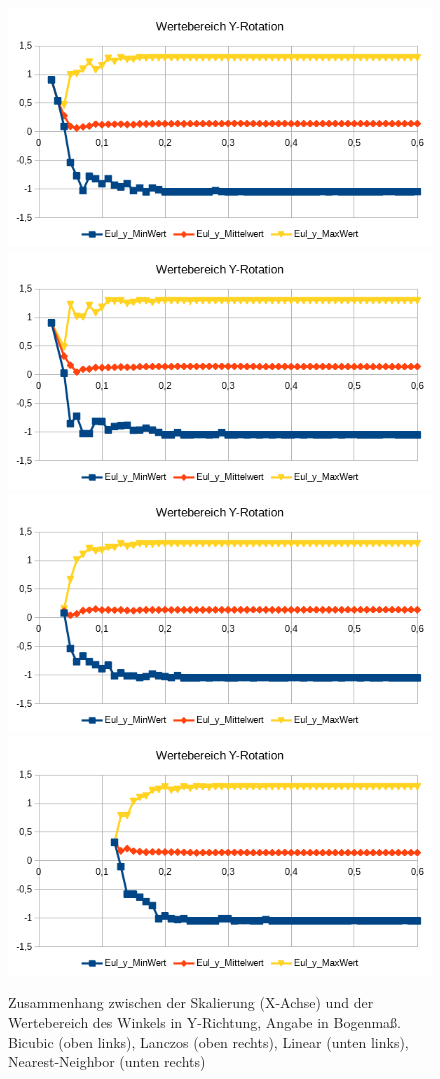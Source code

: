 \begin{figure}
	\centering
	\includegraphics[width=0.45\linewidth]{tabelle2/Y_Rot_Val_Cubic}
	\includegraphics[width=0.45\linewidth]{tabelle2/Y_Rot_Val_Lanc}
	\includegraphics[width=0.45\linewidth]{tabelle2/Y_Rot_Val_Linear}
	\includegraphics[width=0.45\linewidth]{tabelle2/Y_Rot_Val_NN}
	\caption{Zusammenhang zwischen der Skalierung (X-Achse) und der Wertebereich des Winkels in Y-Richtung, Angabe in Bogenmaß.
		Bicubic (oben links), Lanczos (oben rechts), Linear (unten links), Nearest-Neighbor (unten rechts)}
	\label{img_Y_Rot_Val_Skal}
\end{figure}
